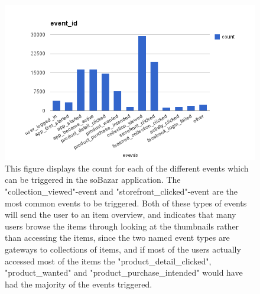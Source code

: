 
    \begin{figure}[H]
        \includegraphics[width=5in]{image/event_id.png}
        \centering
        \caption[Count for different events]{This figure displays the count for each of the different events which can be triggered in the soBazar application.
        The "collection\_viewed"-event and "storefront\_clicked"-event are the most common events to be triggered.
        Both of these types of events will send the user to an item overview, and indicates that many users browse the items through looking at the thumbnails rather than accessing the items, since the two named event types are gateways to collections of items, and if most of the users actually accessed most of the items the "product\_detail\_clicked", "product\_wanted" and "product\_purchase\_intended" would have had the majority of the events triggered.}
    \end{figure}

